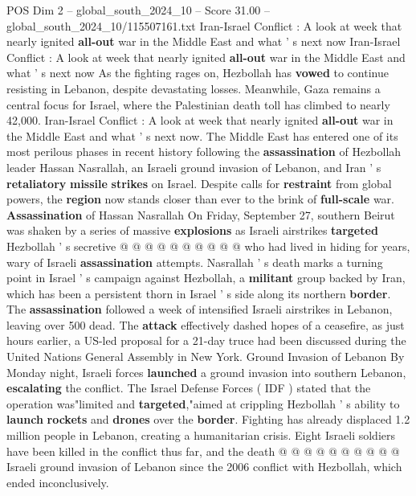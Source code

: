 \begin{textsample}{POS Dim 2 – global\_south\_2024\_10 – Score 31.00 – global\_south\_2024\_10/115507161.txt}  \label{ex:f2_pos_030}
Iran-Israel Conflict : A look at week that nearly ignited \textbf{all-out} war in the Middle East and what ' s next now Iran-Israel Conflict : A look at week that nearly ignited \textbf{all-out} war in the Middle East and what ' s next now As the fighting rages on, Hezbollah has \textbf{vowed} to continue resisting in Lebanon, despite devastating losses.
Meanwhile, Gaza remains a central focus for Israel, where the Palestinian death toll has climbed to nearly 42,000.
Iran-Israel Conflict : A look at week that nearly ignited \textbf{all-out} war in the Middle East and what ' s next now.
The Middle East has entered one of its most perilous phases in recent history following the \textbf{assassination} of Hezbollah leader Hassan Nasrallah, an Israeli ground invasion of Lebanon, and Iran ' s \textbf{retaliatory} \textbf{missile} \textbf{strikes} on Israel.
Despite calls for \textbf{restraint} from global powers, the \textbf{region} now stands closer than ever to the brink of \textbf{full-scale} war. \textbf{Assassination} of Hassan Nasrallah On Friday, September 27, southern Beirut was shaken by a series of massive \textbf{explosions} as Israeli airstrikes \textbf{targeted} Hezbollah ' s secretive @ @ @ @ @ @ @ @ @ @ who had lived in hiding for years, wary of Israeli \textbf{assassination} attempts.
Nasrallah ' s death marks a turning point in Israel ' s campaign against Hezbollah, a \textbf{militant} group backed by Iran, which has been a persistent thorn in Israel ' s side along its northern \textbf{border}.
The \textbf{assassination} followed a week of intensified Israeli airstrikes in Lebanon, leaving over 500 dead.
The \textbf{attack} effectively dashed hopes of a ceasefire, as just hours earlier, a US-led proposal for a 21-day truce had been discussed during the United Nations General Assembly in New York.
Ground Invasion of Lebanon By Monday night, Israeli forces \textbf{launched} a ground invasion into southern Lebanon, \textbf{escalating} the conflict.
The Israel Defense Forces ( IDF ) stated that the operation was"limited and \textbf{targeted},"aimed at crippling Hezbollah ' s ability to \textbf{launch} \textbf{rockets} and \textbf{drones} over the \textbf{border}.
Fighting has already displaced 1.2 million people in Lebanon, creating a humanitarian crisis.
Eight Israeli soldiers have been killed in the conflict thus far, and the death @ @ @ @ @ @ @ @ @ @ Israeli ground invasion of Lebanon since the 2006 conflict with Hezbollah, which ended inconclusively.

\end{textsample}
